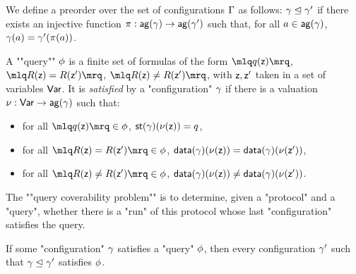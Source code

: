 \begin{definition}
We define a preorder over the set of configurations $\Gamma$ as follows: $\gamma \trianglelefteq \gamma'$ if there exists an injective function $\pi: \mathsf{ag}(\gamma) \rightarrow \mathsf{ag}(\gamma')$ such that, for all $a \in \mathsf{ag}(\gamma)$, $\gamma(a) = \gamma'(\pi(a))$. 
\end{definition}

\begin{definition}
	A ""query"" $\phi$ is a finite set of formulas of the form $\quotemarks{q(\var{z})}$, $\quotemarks{R(\var{z}) = R(\var{z}')}$, $\quotemarks{R(\var{z}) \neq R(\var{z}')}$, with $\mathsf{z}, \mathsf{z}'$ taken in a set of variables $\mathsf{Var}$.
	It is \emph{satisfied} by a "configuration" $\gamma$ if there is a valuation $\nu : \mathsf{Var} \to \mathsf{ag}(\gamma)$ such that:
	\begin{itemize}
		\item for all $\quotemarks{q(\var{z})} \in \query$, $\mathsf{st}(\gamma)(\nu(\mathsf{z})) = q$,
		
		\item for all $\quotemarks{R(\var{z}) = R(\var{z'})} \in \query$, $\mathsf{data}(\gamma)(\nu(\mathsf{z})) = \mathsf{data}(\gamma)(\nu(\mathsf{z'}))$,
		
		\item for all $\quotemarks{R(\var{z}) \neq R(\var{z'})} \in \query$, $\mathsf{data}(\gamma)(\nu(\mathsf{z})) \neq \mathsf{data}(\gamma)(\nu(\mathsf{z'}))$.
	\end{itemize}

	\AP The ""query coverability problem"" is to determine, given a "protocol" and a "query", whether there is a "run" of this protocol whose last "configuration" satisfies the query.
\end{definition}

\begin{remark}
\label{rem:bigger_config_query}
If some "configuration" $\gamma$ satisfies a "query" $\phi$, then every configuration $\gamma'$ such that $\gamma \trianglelefteq \gamma'$ satisfies $\phi$. 
\end{remark}




